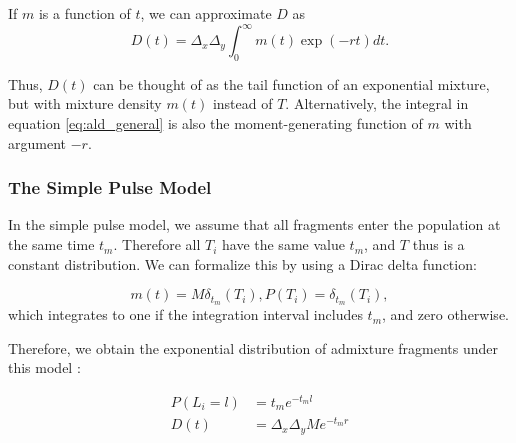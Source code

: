 \documentclass[11pt]{article}
\begin{document}
If $m$ is a function of $t$, we can approximate $D$ as 
\begin{equation}
    D(t) = \Delta_x\Delta_y\int_0^\infty m(t)\exp(-rt) dt \text{.} \label{eq:ld_general}
\end{equation}

Thus, $D(t)$ can be thought of as the tail function of an exponential mixture, but with mixture density $m(t)$ instead of $T$. Alternatively, the integral in equation \ref{eq:ald_general} is also the moment-generating function of $m$ with argument $-r$. 




\subsubsection{The Simple Pulse Model}\label{The Simple Pulse Model}
	
	
In the simple pulse model, we assume that all fragments enter the population at the same time $t_m$. Therefore all $T_i$ have the same value $t_m$, and $T$ thus is a constant distribution. We can formalize this by using a Dirac delta function:

\begin{subequations}
\begin{equation}
\label{eq:RV_simple_pulse}
	m(t)=  M\delta_{t_m}(T_i),
\end{equation} 
	
\begin{equation}
\label{eq:RV_simple_pulse}
	P(T_i)=\delta_{t_m}(T_i),
\end{equation} 
\end{subequations}
which integrates to one if the integration interval includes $t_m$, and zero otherwise.

	
Therefore, we obtain the exponential distribution of admixture fragments under this model \citep[e.g.][]{moorjani_history_2011}:

\begin{subequations}
\begin{align}
\label{eq:Likelihood_function_simple_pulse}
	P(L_i=l) &= t_me^{-t_m l}\\
	D(t) &= \Delta_x\Delta_y M e^{-t_m r}
\end{align}
\end{subequations}	
\end{document}
